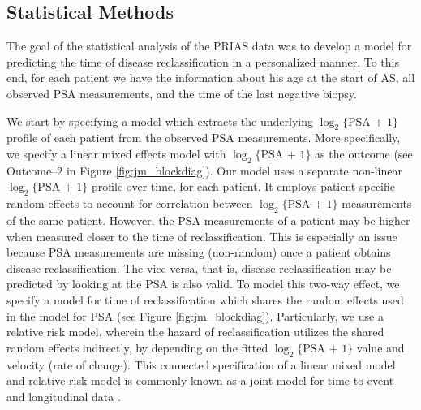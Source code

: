 \subsection{Statistical Methods}
The goal of the statistical analysis of the PRIAS data was to develop a model for predicting the time of disease reclassification in a personalized manner. To this end, for each patient we have the information about his age at the start of AS, all observed PSA measurements, and the time of the last negative biopsy. 

We start by specifying a model which extracts the underlying $\log_2\{\mbox{PSA + 1}\}$ profile of each patient from the observed PSA measurements. More specifically, we specify a linear mixed effects model with $\log_2\{\mbox{PSA + 1}\}$ as the outcome (see Outcome--2 in Figure \ref{fig:jm_blockdiag}). Our model uses a separate non-linear $\log_2\{\mbox{PSA + 1}\}$ profile over time, for each patient. It employs patient-specific random effects to account for correlation between $\log_2\{\mbox{PSA + 1}\}$ measurements of the same patient. However, the PSA measurements of a patient may be higher when measured closer to the time of reclassification. This is especially an issue because PSA measurements are missing (non-random) once a patient obtains disease reclassification. The vice versa, that is, disease reclassification may be predicted by looking at the PSA is also valid. To model this two-way effect, we specify a model for time of reclassification which shares the random effects used in the model for PSA (see Figure \ref{fig:jm_blockdiag}). Particularly, we use a relative risk model, wherein the hazard of reclassification utilizes the shared random effects indirectly, by depending on the fitted $\log_2\{\mbox{PSA + 1}\}$ value and velocity (rate of change). This connected specification of a linear mixed model and relative risk model is commonly known as a joint model for time-to-event and longitudinal data \citep{rizopoulos2012joint,tomer2019,coley2017prediction}.

